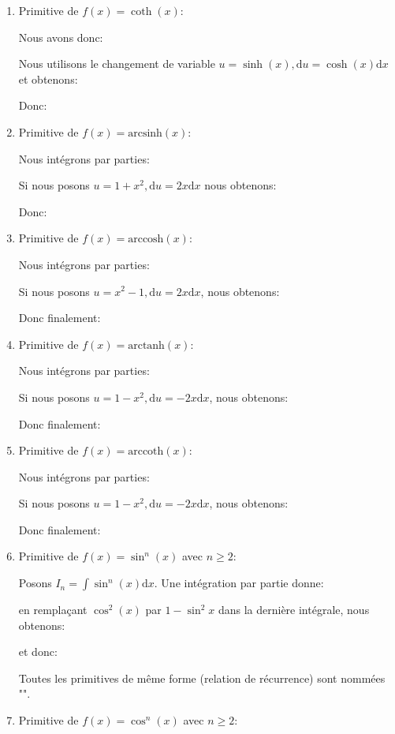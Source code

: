 \begin{enumerate}
		
		\item Primitive de $f(x)=\coth(x)$:
		
		Nous avons donc:
		
		Nous utilisons le changement de variable $u=\sinh(x),\mathrm{d}u=\cosh(x)\mathrm{d}x$ et obtenons:
		
		Donc:
		
		\item Primitive de $f(x)=\text{arcsinh}(x)$:
		
		Nous intégrons par parties:
		
		Si nous posons $u=1+x^2,\mathrm{d}u=2x\mathrm{d}x$ nous obtenons:
		
		Donc:
		
		
		\item Primitive de $f(x)=\text{arccosh}(x)$:
		
		Nous intégrons par parties:
		
		Si nous posons $u=x^2-1,\mathrm{d}u=2x\mathrm{d}x$, nous obtenons:
		
		Donc finalement:
		
		
		\item Primitive de $f(x)=\text{arctanh}(x)$:
		
		Nous intégrons par parties:
		
		Si nous posons $u=1-x^2,\mathrm{d}u=-2x\mathrm{d}x$, nous obtenons:
		
		Donc finalement:
		
		
		\item Primitive de $f(x)=\text{arccoth}(x)$:
		
		Nous intégrons par parties:
		
		Si nous posons  $u=1-x^2,\mathrm{d}u=-2x\mathrm{d}x$, nous obtenons:
		
		Donc finalement:
		
		
		\item Primitive de $f(x)=\sin ^{n}(x)$ avec $n \geq 2$:
		
		Posons $I_n=\int \sin ^n(x)\mathrm{d}x$. Une intégration par partie donne:
		
		en remplaçant $\cos ^2(x)$ par $1-\sin ^2{x}$ dans la dernière intégrale, nous obtenons:
		
		et donc:
		
		Toutes les primitives de même forme (relation de récurrence) sont nommées "".
		
		\item Primitive de $f(x)=\cos ^{n}(x)$ avec $n \geq 2$:
		

\end{enumerate}
